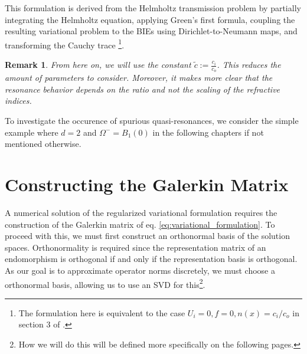 \documentclass[10pt,journal,compsoc, onecolumn]{IEEEtran}
\newtheorem{remark}[theorem]{Remark}
\begin{document}
This formulation is derived from the Helmholtz transmission problem by partially integrating the Helmholtz equation, 
applying Green's first formula, coupling the resulting variational problem to 
the BIEs using Dirichlet-to-Neumann maps, and transforming the Cauchy trace \cite{meury2007stable} 
\footnote{The formulation here is equivalent to the case 
 $U_i = 0, f = 0, n(x) = c_i / c_o$ in section 3 of \cite{meury2007stable}.}.
\begin{remark}
    From here on, we will use the constant $\tilde c := \frac{c_i}{c_o}$. This reduces the amount of parameters 
    to consider. Moreover,
    it makes more clear that the resonance behavior 
    depends on the ratio and not the scaling
    of the refractive indices.
\end{remark}
To investigate the occurence of spurious quasi-resonances, 
we consider the simple example where $d = 2$ and $\Omega^- = B_1(0)$ in the following chapters if not mentioned otherwise. 
\section{Constructing the Galerkin Matrix}
A numerical solution of the regularized variational formulation requires the 
construction of the Galerkin matrix of eq. \ref{eq:variational_formulation}. 
To proceed with this, we must first construct an
 orthonormal basis of the solution spaces. 
Orthonormality is required since the representation matrix 
of an endomorphism is orthogonal if and only if the representation basis is orthogonal. 
As our goal is to approximate operator norms discretely, we must choose a orthonormal basis, 
allowing us to use an SVD for this\footnote{How we will do this will be defined more specifically on the following pages.}.
\end{document}
